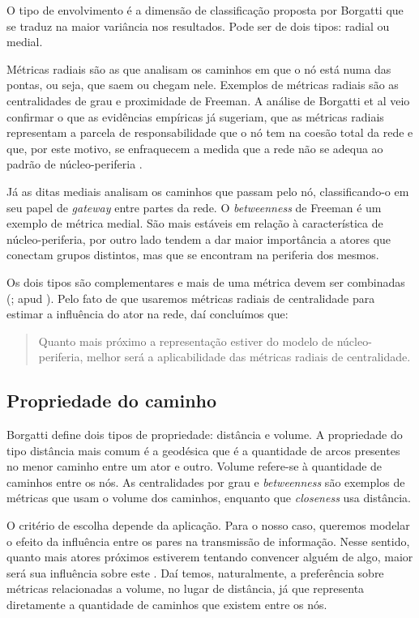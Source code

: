 O tipo de envolvimento é a dimensão de classificação proposta por Borgatti que
se traduz na maior variância nos resultados. Pode ser de dois tipos: radial ou
medial.

Métricas radiais são as que analisam os caminhos em que o nó está numa das
pontas, ou seja, que saem ou chegam nele. Exemplos de métricas radiais são as
centralidades de grau e proximidade de Freeman. A análise de Borgatti et al veio
confirmar o que as evidências empíricas já sugeriam, que as métricas radiais
representam a parcela de responsabilidade que o nó tem na coesão total da rede e
que, por este motivo, se enfraquecem a medida que a rede não se adequa ao padrão
de núcleo-periferia \citep{Nakao1990}.

Já as ditas mediais analisam os caminhos que passam pelo nó, classificando-o em
seu papel de \emph{gateway} entre partes da rede. O \emph{betweenness} de
Freeman é um exemplo de métrica medial. São mais estáveis em relação à
característica de núcleo-periferia, por outro lado tendem a dar maior importância
a atores que conectam grupos distintos, mas que se encontram na periferia dos
mesmos.

Os dois tipos são complementares e mais de uma métrica devem ser combinadas
(\citealt{Stephenson1989}; apud \citealt{Wasserman}). Pelo fato de que
usaremos métricas radiais de centralidade para estimar a influência do ator na
rede, daí concluímos que:

\begin{quote}
Quanto mais próximo a representação estiver do modelo de núcleo-periferia,
melhor será a aplicabilidade das métricas radiais de centralidade.
\end{quote}

\subsection{Propriedade do caminho}

Borgatti define dois tipos de propriedade: distância e volume. A
propriedade do tipo distância mais comum é a geodésica que é a quantidade de
arcos presentes no menor caminho entre um ator e outro. Volume refere-se à
quantidade de caminhos entre os nós. As centralidades por grau e
\emph{betweenness} são exemplos de métricas que usam o volume dos caminhos,
enquanto que \emph{closeness} usa distância.

O critério de escolha depende da aplicação. Para o nosso caso, queremos modelar o
efeito da influência entre os pares na transmissão de informação. Nesse sentido,
quanto mais atores próximos estiverem tentando convencer alguém de algo, maior
será sua influência sobre este \citep{Watts2007}. Daí temos, naturalmente, a
preferência sobre métricas relacionadas a volume, no lugar de distância, já que
representa diretamente a quantidade de caminhos que existem entre os nós.

